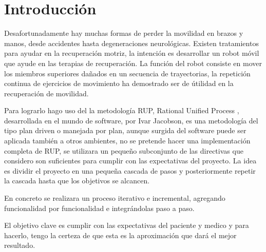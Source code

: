 \documentclass[b5paper]{book}
\begin{document}
\chapter{Introducción}\label{cap.introduccion}
Desafortunadamente hay muchas formas de perder la movilidad en brazos y 
manos, desde accidentes hasta degeneraciones neurológicas. Existen tratamientos 
para ayudar en la recuperación motriz, la intención es desarrollar un robot 
móvil que ayude en las terapias de recuperación. La función del robot consiste en 
mover los miembros superiores dañados en un secuencia de trayectorias, la
repetición continua de ejercicios de movimiento ha demostrado ser de útilidad
en la recuperación de movilidad.

Para lograrlo hago uso del la metodología RUP, Rational Unified Process \cite{booch}, 
desarrollada en el mundo de software, por Ivar Jacobson, es una metodología 
del tipo plan driven o manejada por plan, aunque surgida del software puede ser 
aplicada también a otros ambientes, no se pretende hacer una implementación completa
de RUP, se utilizara un pequeño subconjunto de las directivas que considero son 
suficientes para cumplir con las expectativas del proyecto. La idea es dividir 
el proyecto 
en una pequeña cascada de pasos y posteriormente repetir la cascada hasta que los
objetivos se alcancen.

En concreto se realizara un proceso iterativo e incremental, agregando funcionalidad
por funcionalidad e integrándolas paso a paso. 

El objetivo clave es cumplir con las expectativas del paciente y medico y para
hacerlo, tengo la certeza de que esta es la aproximación que dará el mejor resultado.








\printbibliography[title={Bibliografía}]
\end{document}
